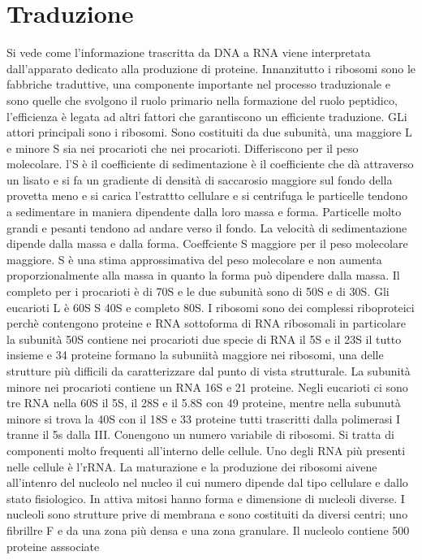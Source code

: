 \chapter{Traduzione}
Si vede come l'informazione trascritta da DNA a RNA viene interpretata dall'apparato dedicato alla produzione di proteine. Innanzitutto i ribosomi sono le fabbriche traduttive, 
una componente importante nel processo traduzionale e sono quelle che svolgono il ruolo primario nella formazione del ruolo peptidico, l'efficienza \`e legata ad altri fattori che
garantiscono un efficiente traduzione. GLi attori principali sono i ribosomi. Sono costituiti da due subunit\`a, una maggiore L e minore S sia nei procarioti che nei procarioti. 
Differiscono per il peso molecolare. l'S \`e il coefficiente di sedimentazione \`e il coefficiente che d\`a attraverso un lisato e si fa un gradiente di densit\`a di saccarosio maggiore
sul fondo della provetta meno e si carica l'estrattto cellulare e si centrifuga le particelle tendono a sedimentare in maniera dipendente dalla loro massa e forma. Particelle molto grandi
e pesanti tendono ad andare verso il fondo. La velocit\`a di sedimentazione dipende dalla massa e dalla forma. Coeffciente S maggiore per il peso molecolare maggiore. S \`e una stima 
approssimativa del peso molecolare e non aumenta proporzionalmente alla massa in quanto la forma pu\`o dipendere dalla massa. Il completo per i procarioti \`e di 70S e le due subunit\`a
sono di 50S e di 30S. Gli eucarioti L \`e 60S S 40S e completo 80S. I ribosomi sono dei complessi riboproteici perch\`e contengono proteine e RNA sottoforma di RNA ribosomali in 
particolare la subunit\`a 50S contiene nei procarioti due specie di RNA il 5S e il 23S il tutto insieme e 34 proteine formano la subuniit\`a maggiore nei ribosomi, una delle strutture
pi\`u difficili da caratterizzare dal punto di vista strutturale. La subunit\`a minore nei procarioti contiene un RNA 16S e 21 proteine. Negli eucarioti ci sono tre RNA nella 60S il 5S, 
il 28S e il 5.8S con 49 proteine, mentre nella subunut\`a minore si trova la 40S con il 18S e 33 proteine tutti trascritti dalla polimerasi I tranne il 5s dalla III. Conengono un numero
variabile di ribosomi. Si tratta di componenti molto frequenti all'interno delle cellule. Uno degli RNA pi\`u presenti nelle cellule \`e l'rRNA. La maturazione e la produzione dei 
ribosomi aivene all'intenro del nucleolo nel nucleo il cui numero dipende dal tipo cellulare e dallo stato fisiologico. In attiva mitosi hanno forma e dimensione di nucleoli diverse. I
nucleoli sono strutture prive di membrana e sono costituiti da diversi centri; uno fibrillre F e da una zona pi\`u densa e una zona granulare. Il nucleolo contiene 500 proteine asssociate
